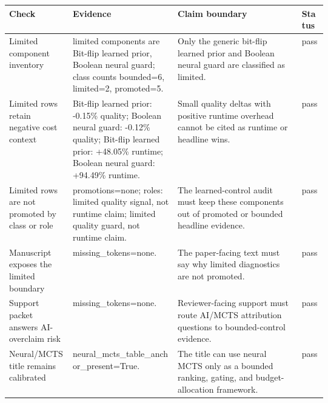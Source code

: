 \begin{tabularx}{\linewidth}{>{\raggedright\arraybackslash}p{0.20\linewidth}>{\raggedright\arraybackslash}p{0.33\linewidth}>{\raggedright\arraybackslash}X>{\raggedright\arraybackslash}p{0.08\linewidth}}
\toprule
Check & Evidence & Claim boundary & Status \\
\midrule
Limited component inventory & limited components are Bit-flip learned prior, Boolean neural guard; class counts bounded=6, limited=2, promoted=5. & Only the generic bit-flip learned prior and Boolean neural guard are classified as limited. & pass \\
Limited rows retain negative cost context & Bit-flip learned prior: -0.15\% quality; Boolean neural guard: -0.12\% quality; Bit-flip learned prior: +48.05\% runtime; Boolean neural guard: +94.49\% runtime. & Small quality deltas with positive runtime overhead cannot be cited as runtime or headline wins. & pass \\
Limited rows are not promoted by class or role & promotions=none; roles: limited quality signal, not runtime claim; limited quality guard, not runtime claim. & The learned-control audit must keep these components out of promoted or bounded headline evidence. & pass \\
Manuscript exposes the limited boundary & missing\_tokens=none. & The paper-facing text must say why limited diagnostics are not promoted. & pass \\
Support packet answers AI-overclaim risk & missing\_tokens=none. & Reviewer-facing support must route AI/MCTS attribution questions to bounded-control evidence. & pass \\
Neural/MCTS title remains calibrated & neural\_mcts\_table\_anchor\_present=True. & The title can use neural MCTS only as a bounded ranking, gating, and budget-allocation framework. & pass \\
\bottomrule
\end{tabularx}
